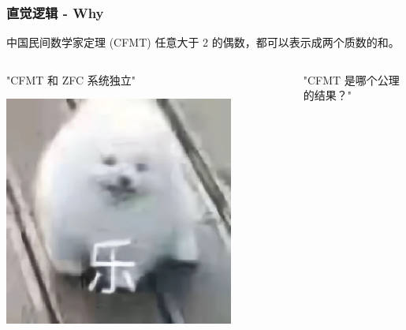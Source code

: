 \documentclass[UTF-8]{ctexbeamer}
\begin{document}
\begin{frame}
  \frametitle{直觉逻辑 - Why}
  
  \pause

  \begin{block}{中国民间数学家定理 (CFMT)}
    任意大于 2 的偶数，都可以表示成两个质数的和。
  \end{block}

  \pause

  \vspace{1em}

  \begin{columns}
    \begin{column}{0.5\textwidth}
      \centering
      "CFMT 和 ZFC 系统独立"

      \pause
      \vspace{0.5em}

      \includegraphics[width=0.8\textwidth]{assets/le.png}
    \end{column}
    \pause
    \begin{column}{0.5\textwidth}
      \centering
      "CFMT 是哪个公理的结果？"

      \pause
      \vspace{0.5em}


\end{column}
\end{columns}
\end{frame}
\end{document}

